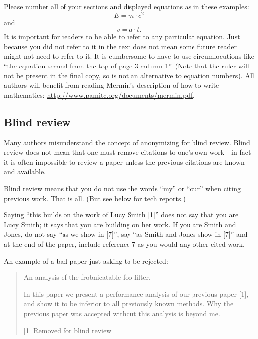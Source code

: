 \documentclass[10pt,twocolumn,letterpaper]{article}
\begin{document}
Please number all of your sections and displayed equations as in these examples:
\begin{equation}
  E = m\cdot c^2
  \label{eq:important}
\end{equation}
and
\begin{equation}
  v = a\cdot t.
  \label{eq:also-important}
\end{equation}
It is important for readers to be able to refer to any particular equation.
Just because you did not refer to it in the text does not mean some future reader might not need to refer to it.
It is cumbersome to have to use circumlocutions like ``the equation second from the top of page 3 column 1''.
(Note that the ruler will not be present in the final copy, so is not an alternative to equation numbers).
All authors will benefit from reading Mermin's description of how to write mathematics:
\url{http://www.pamitc.org/documents/mermin.pdf}.

\subsection{Blind review}

Many authors misunderstand the concept of anonymizing for blind review.
Blind review does not mean that one must remove citations to one's own work---in fact it is often impossible to review a paper unless the previous citations are known and available.

Blind review means that you do not use the words ``my'' or ``our'' when citing previous work.
That is all.
(But see below for tech reports.)

Saying ``this builds on the work of Lucy Smith [1]'' does not say that you are Lucy Smith;
it says that you are building on her work.
If you are Smith and Jones, do not say ``as we show in [7]'', say ``as Smith and Jones show in [7]'' and at the end of the paper, include reference 7 as you would any other cited work.

An example of a bad paper just asking to be rejected:
\begin{quote}
\begin{center}
    An analysis of the frobnicatable foo filter.
\end{center}

   In this paper we present a performance analysis of our previous paper [1], and show it to be inferior to all previously known methods.
   Why the previous paper was accepted without this analysis is beyond me.

   [1] Removed for blind review
\end{quote}
\end{document}
